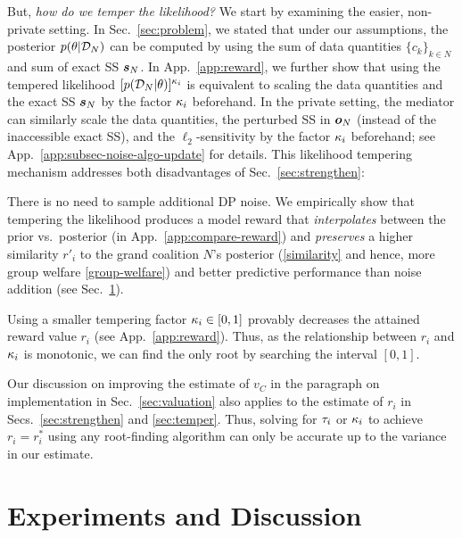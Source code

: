 \documentclass{article}
\DeclareRobustCommand{\hlp}[1]
{{#1}}
\theoremstyle{plain}
\theoremstyle{definition}
\theoremstyle{remark}
\begin{document}
\hlp{But, \emph{how do we temper the likelihood?} We start by examining the easier, non-private setting.} In Sec.~\ref{sec:problem}, we stated that under our assumptions, the posterior $p(\theta|{\mathcal{D}}_N)$ can be computed by using the sum of data quantities $\{c_k\}_{k \in N}$ and sum of exact SS ${\bm{s}}_N$. In App.~\ref{app:reward}, we further show that using the tempered likelihood $[p({\mathcal{D}}_N|\theta)]^{\kappa_i}$ is equivalent to scaling the data quantities and the exact SS ${\bm{s}}_N$ by the factor ${\kappa_i}$ beforehand. 
In the private setting, the mediator can similarly scale the data quantities, the perturbed SS in ${\bm{o}}_N$ (instead of the inaccessible exact SS), and the $\ell_2$-sensitivity by the factor ${\kappa_i}$ beforehand; see App.~\ref{app:subsec-noise-algo-update} for details.
This likelihood tempering mechanism addresses both disadvantages of Sec.~\ref{sec:strengthen}: 
\squishlisttwo
\item There is no need to sample additional DP noise. We empirically show that tempering the likelihood produces a model reward that \emph{interpolates} between the prior vs.~posterior (in App.~\ref{app:compare-reward}) and \emph{preserves} a higher similarity $r'_i$ to the grand coalition $N$'s posterior (\ref{similarity} and hence,  more group welfare \ref{group-welfare}) and better predictive performance than noise addition (see Sec.~\ref{sec:experiments}). %
\item Using a smaller tempering factor ${\kappa_i} \in [0,1]$ provably decreases the attained reward value $r_i$ (see App.~\ref{app:reward}). Thus, as the relationship between $r_i$ and ${\kappa_i}$ is monotonic, we can find the only root by searching the interval $[0,1]$.
\squishend

Our discussion on improving the estimate of $v_C$ in the paragraph on implementation in Sec.~\ref{sec:valuation} also applies to the estimate of $r_i$ in  Secs.~\ref{sec:strengthen} and \ref{sec:temper}.
Thus, solving for ${\tau_i}$ or ${\kappa_i}$ to achieve $r_i = r^*_i$ using any root-finding algorithm 
can only be accurate up to the variance in our estimate.


\section{Experiments and Discussion}\label{sec:experiments}%
\end{document}
